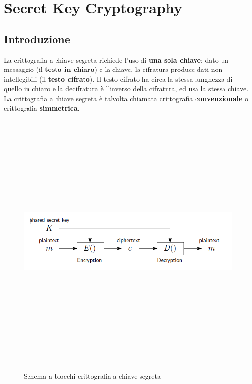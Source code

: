 \chapter{Secret Key Cryptography} \label{ch:secretkey}

\section{Introduzione}
La crittografia a chiave segreta richiede l'uso di \textbf{una sola chiave}: dato un messaggio (il \textbf{testo in chiaro}) e la chiave, la cifratura produce dati non intellegibili (il \textbf{testo cifrato}). Il testo cifrato ha circa la stessa lunghezza di quello in chiaro e la decifratura è l'inverso della cifratura, ed usa la stessa chiave. La crittografia a chiave segreta è talvolta chiamata crittografia \textbf{convenzionale} o crittografia \textbf{simmetrica}.
\begin{figure}[htbp]
	\centering%
	\subfigure%
	{\includegraphics[height=13cm, width=13cm, keepaspectratio]{Immagini/chiave_segreta/segreta_schema_blocchi.png}}
	\caption{Schema a blocchi crittografia a chiave segreta \label{fig:segreta_schema_blocchi}} 	
\end{figure}

